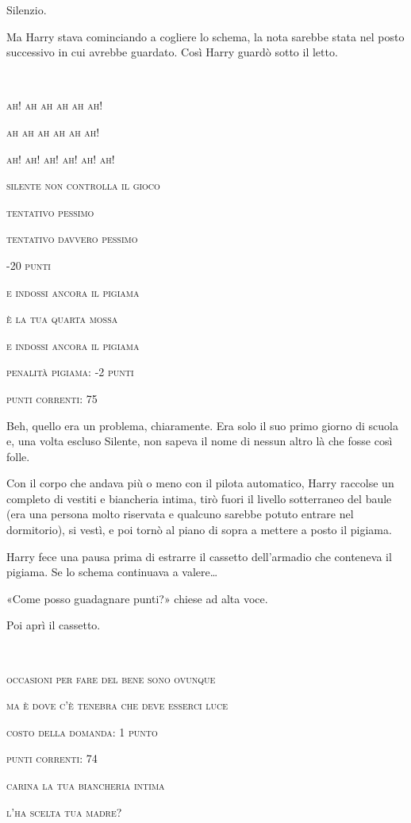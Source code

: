 Silenzio.

Ma Harry stava cominciando a cogliere lo schema, la nota sarebbe stata nel posto successivo in cui avrebbe guardato. Così Harry guardò sotto il letto.

\begin{addmargin}[3em]{3em}%
~

\textsc{ah! ah ah ah ah ah!}

\textsc{ah ah ah ah ah ah!}

\textsc{ah! ah! ah! ah! ah! ah!}

\textsc{silente non controlla il gioco}

\textsc{tentativo pessimo}

\textsc{tentativo davvero pessimo}

\textsc{-20 punti}

\textsc{e indossi ancora il pigiama}

\textsc{è la tua quarta mossa}

\textsc{e indossi ancora il pigiama}

\textsc{penalità pigiama: -2 punti}

\textsc{punti correnti: 75}\\
\end{addmargin}

Beh, quello era un problema, chiaramente. Era solo il suo primo giorno di scuola e, una volta escluso Silente, non sapeva il nome di nessun altro là che fosse così folle.

Con il corpo che andava più o meno con il pilota automatico, Harry raccolse un completo di vestiti e biancheria intima, tirò fuori il livello sotterraneo del baule (era una persona molto riservata e qualcuno sarebbe potuto entrare nel dormitorio), si vestì, e poi tornò al piano di sopra a mettere a posto il pigiama.

Harry fece una pausa prima di estrarre il cassetto dell’armadio che conteneva il pigiama. Se lo schema continuava a valere…

«Come posso guadagnare punti?» chiese ad alta voce.

Poi aprì il cassetto.

\begin{addmargin}[3em]{3em}%
~

\textsc{occasioni per fare del bene sono ovunque}

\textsc{ma è dove c’è tenebra che deve esserci luce}

\textsc{costo della domanda: 1 punto}

\textsc{punti correnti: 74}

\textsc{carina la tua biancheria intima}

\textsc{l’ha scelta tua madre?}\\
\end{addmargin}

